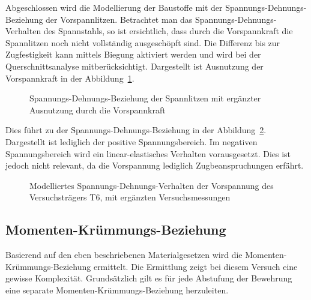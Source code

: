 \documentclass[
  11pt,
  letterpaper,
]{scrreprt}
\begin{document}
Abgeschlossen wird die Modellierung der Baustoffe mit der
Spannungs-Dehnungs-Beziehung der Vorspannlitzen. Betrachtet man das
Spannungs-Dehnungs-Verhalten des Spannstahls, so ist ersichtlich, dass
durch die Vorspannkraft die Spannlitzen noch nicht vollständig
ausgeschöpft sind. Die Differenz bis zur Zugfestigkeit kann mittels
Biegung aktiviert werden und wird bei der Querschnittsanalyse
mitberücksichtigt. Dargestellt ist Ausnutzung der Vorspannkraft in der
Abbildung~\ref{fig-ausnutzung_sigma_p}.

\begin{figure}[H]


\caption{\label{fig-ausnutzung_sigma_p}Spannungs-Dehnungs-Beziehung der
Spannlitzen mit ergänzter Ausnutzung durch die Vorspannkraft}

\end{figure}%

Dies führt zu der Spannungs-Dehnungs-Beziehung in der
Abbildung~\ref{fig-sigma_eps_vorspannung_t6}. Dargestellt ist lediglich
der positive Spannungsbereich. Im negativen Spannungsbereich wird ein
linear-elastisches Verhalten vorausgesetzt. Dies ist jedoch nicht
relevant, da die Vorspannung lediglich Zugbeanspruchungen erfährt.

\begin{figure}[H]


\caption{\label{fig-sigma_eps_vorspannung_t6}Modelliertes
Spannungs-Dehnungs-Verhalten der Vorspannung des Versuchsträgers T6, mit
ergänzten Versuchsmessungen}

\end{figure}%

\subsection{Momenten-Krümmungs-Beziehung}\label{momenten-kruxfcmmungs-beziehung}

Basierend auf den eben beschriebenen Materialgesetzen wird die
Momenten-Krümmungs-Beziehung ermittelt. Die Ermittlung zeigt bei diesem
Versuch eine gewisse Komplexität. Grundsätzlich gilt es für jede
Abstufung der Bewehrung eine separate Momenten-Krümmungs-Beziehung
herzuleiten.
\end{document}
